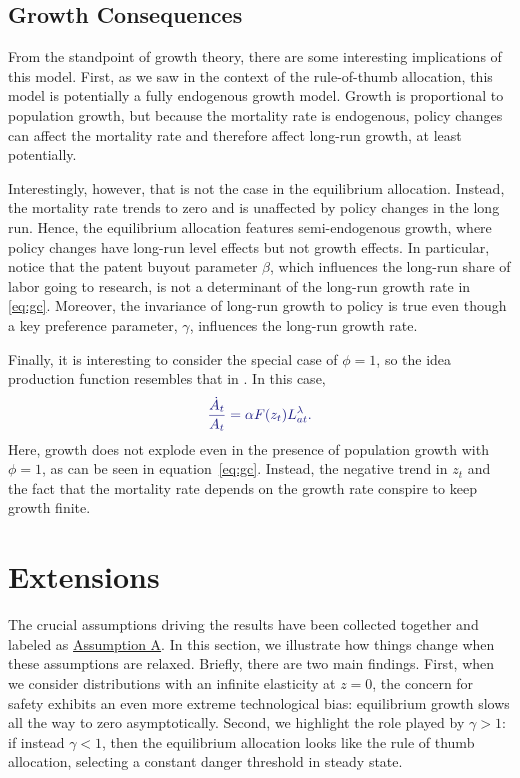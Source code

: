 \documentclass[12pt,twoside]{article}
\newcommand{\cn}[1]{\citet*{#1}}
\newcommand{\clr}[1]{{\color{ChadBlue} #1}}
\begin{document}
\subsection{Growth Consequences}

From the standpoint of growth theory, there are some interesting
implications of this model.  First, as we saw in the context of the
rule-of-thumb allocation, this model is potentially a fully endogenous
growth model.  Growth is proportional to population growth, but because
the mortality rate is endogenous, policy changes can affect the
mortality rate and therefore affect long-run growth, at least
potentially.

Interestingly, however, that is not the case in the equilibrium
allocation. Instead, the mortality rate trends to zero and is unaffected
by policy changes in the long run. Hence, the equilibrium allocation
features semi-endogenous growth, where policy changes have long-run
level effects but not growth effects. In particular, notice that the
patent buyout parameter $\beta$, which influences the long-run share of
labor going to research, is not a determinant of the long-run growth
rate in \eqref{eq:gc}. Moreover, the invariance of long-run growth to
policy is true even though a key preference parameter, $\gamma$,
influences the long-run growth rate.

Finally, it is interesting to consider the special case of $\phi=1$, so
the idea production function resembles that in \cn{Romer90}. In this
case,
\[
\clr{ \frac{\dot{A}_t}{A_t} = \alpha F(z_t) L_{at} ^\lambda. }
\]
Here, growth does not explode even in the presence of population growth
with $\phi=1$, as can be seen in equation~\eqref{eq:gc}. Instead, the
negative trend in $z_t$ and the fact that the mortality rate depends on
the growth rate conspire to keep growth finite.


\section{Extensions}

The crucial assumptions driving the results have been collected together
and labeled as \hyperlink{ASSUME}{Assumption A}. In this section, we
illustrate how things change when these assumptions are relaxed.
Briefly, there are two main findings. First, when we consider
distributions with an infinite elasticity at $z=0$, the concern for
safety exhibits an even more extreme technological bias: equilibrium
growth slows all the way to zero asymptotically. Second, we highlight
the role played by $\gamma>1$: if instead $\gamma<1$, then the
equilibrium allocation looks like the rule of thumb allocation,
selecting a constant danger threshold in steady state.
\end{document}
